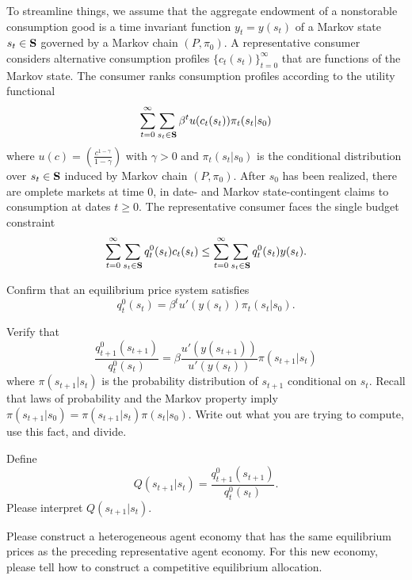 \noindent 
To streamline things, we assume that the aggregate endowment of a nonstorable consumption good is a time invariant function $y_t = y(s_t)$
of a Markov state $s_t \in {\bf S}$ governed by a Markov chain $(P, \pi_0)$.  A representative
consumer considers alternative consumption profiles $\{c_t(s_t)\}_{t=0}^\infty$ that are functions of the Markov state.
The consumer ranks consumption profiles according to the utility functional
$$ \sum_{t=0}^\infty \sum_{s_t \in {\bf S}} \beta^t u(c_t(s_t)) \pi_t(s_t | s_0) $$
where $u(c) = \left({\frac{c^{1-\gamma}}{1 - \gamma}}\right)$ with $\gamma >0$ and $\pi_t(s_t|s_0)$ is the conditional distribution over $s_t \in {\bf S}$ induced by Markov chain  $(P, \pi_0)$.
After $s_0$ has been realized, there are omplete markets at time $0$, in date- and Markov state-contingent
claims to consumption at dates $t \geq 0$.  The representative consumer faces the single budget constraint
$$ \sum_{t=0}^\infty \sum_{s_t \in {\bf S}} q_t^0 (s_t) c_t(s_t) \leq  \sum_{t=0}^\infty \sum_{s_t \in {\bf S}}
q_t^0 (s_t) y(s_t)  .
$$

\medskip
{} Confirm that an equilibrium price system satisfies
$$ q_t^0(s_t) = \beta^t u'(y(s_t)) \pi_t(s_t | s_0) .$$

\medskip
{} Verify that
$$ {\frac{q^0_{t+1}(s_{t+1})}{q^0_t(s_t)}} = \beta {\frac{u'(y(s_{t+1}))}{u'(y(s_t))}} \pi(s_{t+1}| s_t) $$
where $\pi(s_{t+1}| s_t)$ is the probability distribution of $s_{t+1}$ conditional on $s_t$.
\medskip
{} Recall that laws of probability and the Markov property imply $\pi(s_{t+1} | s_0) = \pi(s_{t+1}| s_t) \pi(s_t | s_0)$. 
Write out what you are trying to compute, use this fact, and divide.

\medskip
{}  Define  
$$  Q(s_{t+1} | s_t) =  {\frac{q^0_{t+1}(s_{t+1})}{q^0_t(s_t)}}. $$
Please interpret $ Q(s_{t+1} | s_t)$.

\medskip
{} Please construct a heterogeneous agent economy that has the same equilibrium prices as
the preceding representative agent economy. For this new economy, please tell how to construct a competitive equilibrium allocation.





\eqnotracefalse

